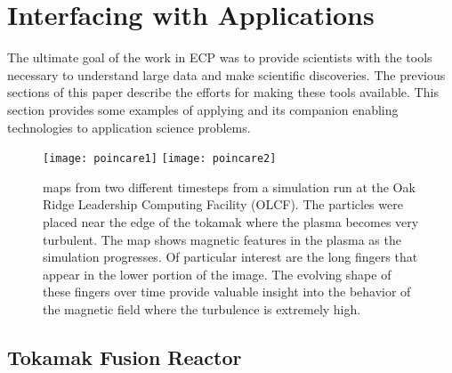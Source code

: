 \section{Interfacing with Applications}

The ultimate goal of the \vtkm work in ECP was to provide scientists with the tools necessary to understand large data and make scientific discoveries.
The previous sections of this paper describe the efforts for making these tools available.
This section provides some examples of applying \vtkm and its companion enabling technologies to application science problems.


\begin{figure}[ht]
  \centering
  \texttt{[image: poincare1]}
  \texttt{[image: poincare2]}
  \caption{\poincare maps from two different timesteps from a simulation run at the Oak Ridge Leadership Computing Facility (OLCF).  The particles were placed near the edge of the tokamak where the plasma becomes very turbulent. The \poincare map shows magnetic features in the plasma as the simulation progresses. Of particular interest are the long fingers that appear in the lower portion of the image. The evolving shape of these fingers over time provide valuable insight into the behavior of the magnetic field where the turbulence is extremely high. }
  \label{fig:poincare}
\end{figure}

\subsection{Tokamak Fusion Reactor}


